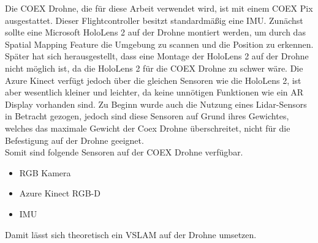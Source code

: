 Die COEX Drohne, die für diese Arbeit verwendet wird, ist mit einem COEX Pix ausgestattet.
Dieser Flightcontroller besitzt standardmäßig eine \ac{IMU}. Zunächst sollte eine Microsoft HoloLens 2 auf der Drohne montiert werden, um durch das Spatial Mapping Feature die Umgebung zu scannen und die Position zu erkennen.
Später hat sich herausgestellt, dass eine Montage der HoloLens 2 auf der Drohne nicht möglich ist, da die HoloLens 2 für die COEX Drohne zu schwer wäre.
Die Azure Kinect verfügt jedoch über die gleichen Sensoren wie die HoloLens 2, ist aber wesentlich kleiner und leichter, da keine unnötigen Funktionen wie ein \ac{AR} Display vorhanden sind.
Zu Beginn wurde auch die Nutzung eines \ac{Lidar}-Sensors in Betracht gezogen, jedoch sind diese Sensoren auf Grund ihres Gewichtes, welches das maximale Gewicht der Coex Drohne überschreitet, nicht für die Befestigung auf der Drohne geeignet.\\
Somit sind folgende Sensoren auf der COEX Drohne verfügbar.

\begin{itemize}
    \item{RGB Kamera}
    \item{Azure Kinect \ac{RGB-D}}
    \item{\ac{IMU}}
\end{itemize}

Damit lässt sich theoretisch ein \ac{VSLAM} auf der Drohne umsetzen.


